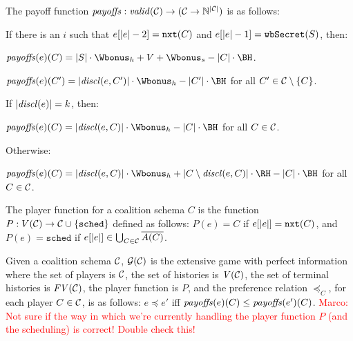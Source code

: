 %
The payoff function $\mathit{payoffs}: \mathit{valid}(\mathcal{C}) \to (\mathcal{C} \to \mathbb{N}^{|\mathcal{C}|})$ is as follows:
%
\begin{compactitem}
\item If there is an $i$ such that 	$e[|e|-2] = \mathtt{nxt}(C)$ and $e[|e|-1]  = \mathtt{wbSecret}(S)$, then:
\begin{compactitem}
\item $\payoffs(e)(C) = |S| \cdot \Wbonus_h + V + \Wbonus_s - |C| \cdot \BH$.
\item $\payoffs(e)(C') = |\disclosedByCoalition{e}{C'}| \cdot  \Wbonus_h - |C'| \cdot \BH$ for all $C' \in \mathcal{C}\setminus\{C\}$.
\end{compactitem}
\item If $|\mathit{discl}(e)| = k$, then: %
\begin{compactitem}
\item $\payoffs(e)(C) = |\disclosedByCoalition{e}{C}| \cdot  \Wbonus_h - |C| \cdot \BH$ for all $C \in \mathcal{C}$.
\end{compactitem}
\item Otherwise:
\begin{compactitem}
\item $\payoffs(e)(C) = |\disclosedByCoalition{e}{C}| \cdot  \Wbonus_h + |C \setminus \disclosedByCoalition{e}{C}| \cdot \RH  - |C| \cdot \BH$ for all $C \in \mathcal{C}$.
\end{compactitem}
\end{compactitem}

%
The player function for a coalition schema $C$ is the function $P: V(\mathcal{C}) \to \mathcal{C} \cup \{\mathtt{sched}\}$ defined as follows:
%
$P(e) = C$ if $e[|e|] = \mathtt{nxt}(C)$, and $P(e) = \mathtt{sched}$ if $e[|e|] \in \bigcup_{C \in \mathcal{C}} \overline{A(C)}$.


%
Given a coalition schema $\mathcal{C}$,  $\mathcal{G}(\mathcal{C})$ is the extensive game with perfect information where the set of players is $\mathcal{C}$, the set of histories is $\mathit{V}(\mathcal{C})$, the set of terminal histories is $\mathit{FV}(\mathcal{C})$, the player function is $P$, and the preference relation $\preceq_C$, for each player $C \in \mathcal{C}$, is as follows: $e \preceq e'$ iff $\mathit{payoffs}(e)(C) \leq \mathit{payoffs}(e')(C)$.
%
\textcolor{red}{Marco: Not sure if the way in which we're currently handling the player function $P$ (and the scheduling) is correct! Double check this!}


